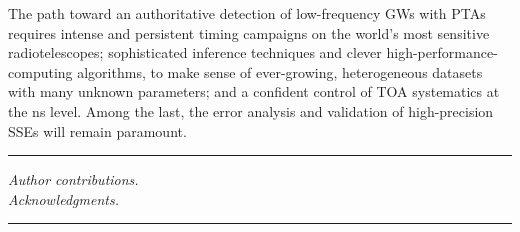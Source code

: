 \documentclass[iop,apj,twocolappendix]{emulateapj}
\begin{document}
The path toward an authoritative detection of low-frequency GWs with PTAs requires intense and persistent timing campaigns on the world's most sensitive radiotelescopes; 
sophisticated inference techniques and clever high-performance-computing algorithms, to make sense of ever-growing, heterogeneous datasets with many unknown parameters; and a confident control of TOA systematics at the ns level. Among the last, the error analysis and validation of high-precision SSEs will remain paramount.

\begin{center}
\rule{0.25\columnwidth}{.4pt}
\end{center}

\emph{Author contributions.} 
\\

\emph{Acknowledgments.} 

\begin{center}
\rule{0.25\columnwidth}{.4pt}
\end{center}



\end{document}
